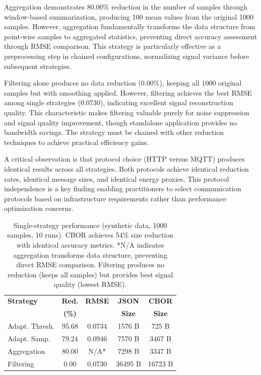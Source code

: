 \documentclass[10pt,twocolumn]{article}
\begin{document}
Aggregation demonstrates 80.00\% reduction in the number of samples through window-based summarization, producing 100 mean values from the original 1000 samples. However, aggregation fundamentally transforms the data structure from point-wise samples to aggregated statistics, preventing direct accuracy assessment through RMSE comparison. This strategy is particularly effective as a preprocessing step in chained configurations, normalizing signal variance before subsequent strategies.

Filtering alone produces no data reduction (0.00\%), keeping all 1000 original samples but with smoothing applied. However, filtering achieves the best RMSE among single strategies (0.0730), indicating excellent signal reconstruction quality. This characteristic makes filtering valuable purely for noise suppression and signal quality improvement, though standalone application provides no bandwidth savings. The strategy must be chained with other reduction techniques to achieve practical efficiency gains.

A critical observation is that protocol choice (HTTP versus MQTT) produces identical results across all strategies. Both protocols achieve identical reduction rates, identical message sizes, and identical energy proxies. This protocol independence is a key finding enabling practitioners to select communication protocols based on infrastructure requirements rather than performance optimization concerns.

\begin{table}[H]
\centering
\small
\begin{tabular}{|l|c|c|c|c|}
\hline
\textbf{Strategy} & \textbf{Red.} & \textbf{RMSE} & \textbf{JSON} & \textbf{CBOR} \\
& \textbf{(\%)} &  & \textbf{Size} & \textbf{Size} \\
\hline
Adapt. Thresh. & 95.68 & 0.0734 & 1576 B & 725 B \\
\hline
Adapt. Samp. & 79.24 & 0.0946 & 7570 B & 3467 B \\
\hline
Aggregation & 80.00 & N/A* & 7298 B & 3347 B \\
\hline
Filtering & 0.00 & 0.0730 & 36495 B & 16723 B \\
\hline
\end{tabular}
\caption{Single-strategy performance (synthetic data, 1000 samples, 10 runs). CBOR achieves 54\% size reduction with identical accuracy metrics. *N/A indicates aggregation transforms data structure, preventing direct RMSE comparison. Filtering produces no reduction (keeps all samples) but provides best signal quality (lowest RMSE).}
\label{tab:singlestrat}
\end{table}
\end{document}
